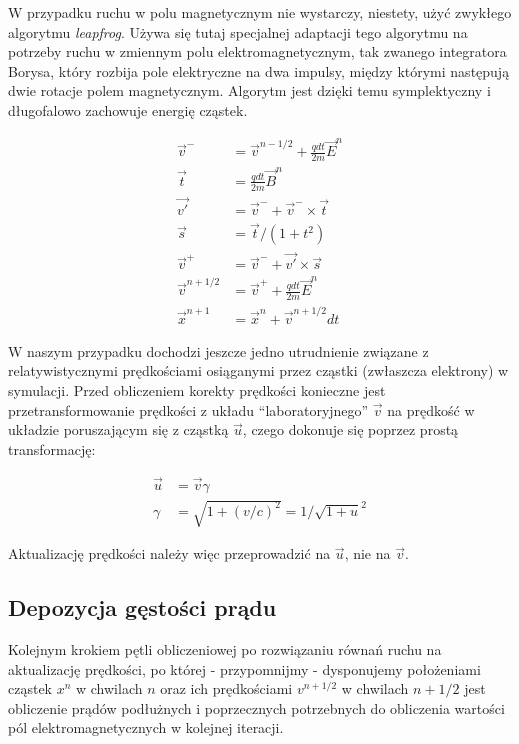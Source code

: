 W przypadku ruchu w polu magnetycznym nie wystarczy, niestety, użyć
zwykłego algorytmu \emph{leapfrog}. Używa się tutaj
specjalnej adaptacji tego algorytmu na potrzeby ruchu w zmiennym polu
elektromagnetycznym, tak zwanego integratora Borysa\cite{boris},
który rozbija pole elektryczne na dwa impulsy,
między którymi następują dwie rotacje polem magnetycznym. Algorytm jest
dzięki temu symplektyczny i długofalowo zachowuje energię cząstek.

\begin{align}
    \vec{v}^- &= \vec{v}^{n-1/2} + \frac{q dt}{2m} \vec{E}^n 
    \label{eqn:boris-pusher-start}\\
    \vec{t} &= \frac{q dt} {2 m} \vec{B}^n \\
    \vec{v'} &= \vec{v}^- + \vec{v}^- \times \vec{t} \\
    \vec{s} &= \vec{t} / {(1 + t^2)} \\
    \vec{v}^+ &= \vec{v}^- + \vec{v'} \times \vec{s} \\
    \vec{v}^{n+1/2} &= \vec{v}^+ + \frac{q dt}{2m} \vec{E}^n \\
    \vec{x}^{n+1} &= \vec{x}^{n} + \vec{v}^{n+1/2} dt
    \label{eqn:boris-pusher-end}
\end{align}

W naszym przypadku dochodzi jeszcze jedno utrudnienie związane z
relatywistycznymi prędkościami osiąganymi przez cząstki (zwłaszcza
elektrony) w symulacji. Przed obliczeniem korekty prędkości konieczne jest
przetransformowanie prędkości z układu ``laboratoryjnego'' $\vec{v}$ na
prędkość w układzie poruszającym się z cząstką $\vec{u}$, czego dokonuje
się poprzez prostą transformację:

\begin{align}
    \vec{u} &= \vec{v} \gamma \\
    \gamma &= \sqrt{1+{(v/c)}^2} = 1/\sqrt{1+u}^2
    \label{eqn:gamma-transformation}
\end{align}


Aktualizację prędkości należy więc przeprowadzić na $\vec{u}$, nie na $\vec{v}$.



\subsection{Depozycja gęstości prądu}

Kolejnym krokiem pętli obliczeniowej po rozwiązaniu równań ruchu na
aktualizację prędkości, po której - przypomnijmy - dysponujemy położeniami
cząstek $x^n$ w chwilach $n$ oraz ich prędkościami $v^{n+1/2}$ w chwilach
$n+1/2$  jest obliczenie prądów podłużnych i
poprzecznych potrzebnych do obliczenia wartości pól elektromagnetycznych w
kolejnej iteracji.

